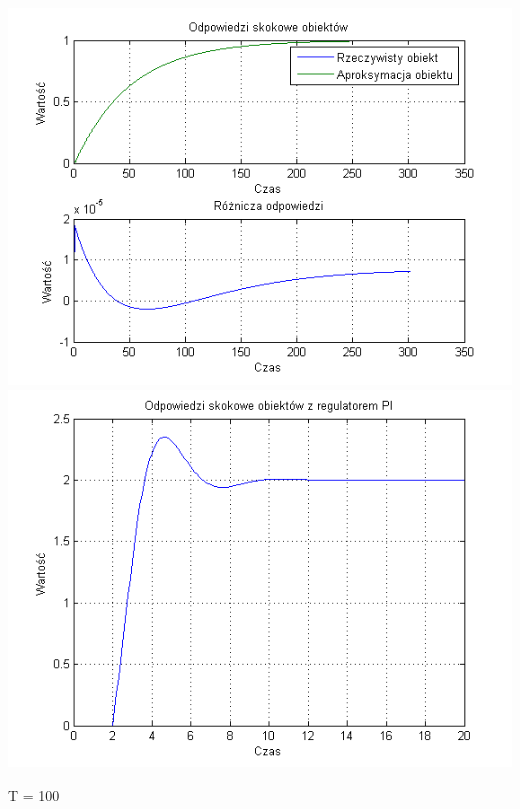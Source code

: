 \documentclass[10pt,a4paper]{article}
\begin{document}
\begin{center}
\includegraphics[scale=1]{images/jeden/skrypt_33.png}\\
\includegraphics[scale=1]{images/jeden/skrypt_34.png}\\
\end{center}
\newpage
T = 100
\end{document}
